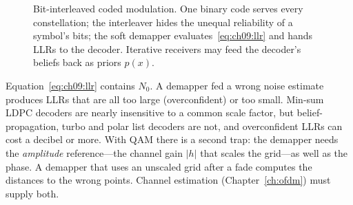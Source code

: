 \begin{figure}[htbp]
\centering
{}
\caption{Bit-interleaved coded modulation. One binary code serves every constellation; the
interleaver hides the unequal reliability of a symbol's bits; the soft demapper
evaluates~\eqref{eq:ch09:llr} and hands LLRs to the decoder. Iterative receivers may feed the
decoder's beliefs back as priors $p(x)$.}
\label{fig:ch09_bicm}
\end{figure}

\begin{pitfall}
Equation~\eqref{eq:ch09:llr} contains $N_0$. A demapper fed a wrong noise estimate produces LLRs
that are all too large (overconfident) or too small. Min-sum LDPC decoders are nearly insensitive to
a common scale factor, but belief-propagation, turbo and polar list decoders are not, and
overconfident LLRs can cost a decibel or more. With QAM there is a second trap: the demapper needs
the \emph{amplitude} reference---the channel gain $|h|$ that scales the grid---as well as the phase.
A demapper that uses an unscaled grid after a fade computes the distances to the wrong points.
Channel estimation (Chapter~\ref{ch:ofdm}) must supply both.
\end{pitfall}

